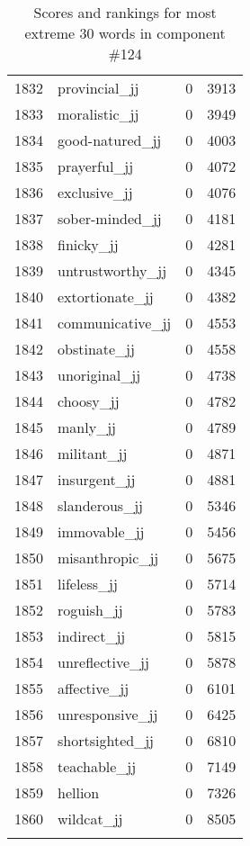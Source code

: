 \begin{longtable}[!htbp]{| rlr@{.}l |}
    1832 & provincial\_jj & 0 & 3913 \\
    1833 & moralistic\_jj & 0 & 3949 \\
    1834 & good-natured\_jj & 0 & 4003 \\
    1835 & prayerful\_jj & 0 & 4072 \\
    1836 & exclusive\_jj & 0 & 4076 \\
    1837 & sober-minded\_jj & 0 & 4181 \\
    1838 & finicky\_jj & 0 & 4281 \\
    1839 & untrustworthy\_jj & 0 & 4345 \\
    1840 & extortionate\_jj & 0 & 4382 \\
    1841 & communicative\_jj & 0 & 4553 \\
    1842 & obstinate\_jj & 0 & 4558 \\
    1843 & unoriginal\_jj & 0 & 4738 \\
    1844 & choosy\_jj & 0 & 4782 \\
    1845 & manly\_jj & 0 & 4789 \\
    1846 & militant\_jj & 0 & 4871 \\
    1847 & insurgent\_jj & 0 & 4881 \\
    1848 & slanderous\_jj & 0 & 5346 \\
    1849 & immovable\_jj & 0 & 5456 \\
    1850 & misanthropic\_jj & 0 & 5675 \\
    1851 & lifeless\_jj & 0 & 5714 \\
    1852 & roguish\_jj & 0 & 5783 \\
    1853 & indirect\_jj & 0 & 5815 \\
    1854 & unreflective\_jj & 0 & 5878 \\
    1855 & affective\_jj & 0 & 6101 \\
    1856 & unresponsive\_jj & 0 & 6425 \\
    1857 & shortsighted\_jj & 0 & 6810 \\
    1858 & teachable\_jj & 0 & 7149 \\
    1859 & hellion & 0 & 7326 \\
    1860 & wildcat\_jj & 0 & 8505 \\
    \hline
    \caption{Scores and rankings for most extreme 30 words in component \#124} \\
\end{longtable}

